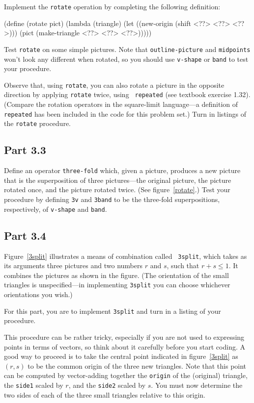 Implement the {\tt rotate} operation by completing the following
definition:

\beginlisp
(define (rotate pict)
  (lambda (triangle)
    (let ((new-origin (shift <??> <??> <??>)))
      (pict (make-triangle <??>
                           <??>
                           <??>)))))
\endlisp

Test {\tt rotate} on some simple pictures.  Note that
{\tt outline-picture} and {\tt midpoints} won't look any different when
rotated, so you should use {\tt v-shape} or {\tt band} to test your
procedure.

Observe that, using {\tt rotate}, you can also rotate a picture in the
opposite direction by applying {\tt rotate} twice, using {\tt
repeated} (see textbook exercise 1.32).  (Compare the rotation
operators in the square-limit language---a definition of {\tt
repeated} has been included in the code for this problem set.)  Turn
in listings of the {\tt rotate} procedure.


\subsection{Part 3.3}

Define an operator {\tt three-fold} which, given a picture, produces a
new picture that is the superposition of three pictures---the original
picture, the picture rotated once, and the picture rotated twice.
(See figure~\ref{rotate}.) Test your procedure by defining {\tt 3v}
and {\tt 3band} to be the three-fold superpositions, respectively, of
{\tt v-shape} and {\tt band}.

\subsection{Part 3.4}

Figure~\ref{3split} illustrates a means of combination called {\tt
3split}, which takes as its arguments three pictures and two numbers
$r$ and $s$, such that $r+s \leq 1$.  It combines the pictures as
shown in the figure.  (The orientation of the small triangles is
unspecified---in implementing {\tt 3split} you can choose whichever
orientations you wish.)

For this part, you are to implement {\tt 3split} and turn in a listing
of your procedure.

This procedure can be rather tricky, especially if you are not used to
expressing points in terms of vectors, so think about it carefully
before you start coding.  A good way to proceed is to take the central
point indicated in figure~\ref{3split} as $(r,s)$ to be the common
origin of the three new triangles.  Note that this point can be
computed by vector-adding together the {\tt origin} of the (original)
triangle, the {\tt side1} scaled by $r$, and the {\tt side2} scaled by
$s$.  You must now determine the two sides of each of the three small
triangles relative to this origin.

